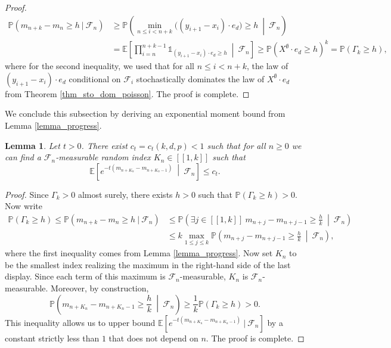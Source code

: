 \documentclass[a4paper, 11pt]{article}
\theoremstyle{plain}
\newtheorem{Lemma}[Theorem]{Lemma}
\theoremstyle{definition}
\newcommand{\E}{\mathbb{E}}
\renewcommand{\P}{\mathbb{P}}
\newcommand{\range}[2]{[\![#1,#2]\!]}
\numberwithin{equation}{section}
\begin{document}
\begin{proof}
        \begin{equation*}
            \begin{split}
                \P\left(m_{n+k}-m_n\geq h~\vert~\mathcal F_n\right)&\geq\P\left(\min_{n\leq i< n+k}\big((y_{i+1}-x_i)\cdot e_d\big)\geq h~\middle|~\mathcal F_n\right)\\
                &=\E\left[\prod_{i=n}^{n+k-1}\mathds 1_{(y_{i+1}-x_i)\cdot e_d\geq h}~\middle\vert~\mathcal F_n\right]
                \geq\P(X^\emptyset\cdot e_d\geq h)^k
                =\P(\Gamma_k\geq h),
            \end{split}
        \end{equation*}
    where for the second inequality, we used that for all $n\leq i<n+k$, the law of $(y_{i+1}-x_i)\cdot e_d$ conditional on $\mathcal F_i$ stochastically dominates the law of $X^\emptyset\cdot e_d$ from Theorem \ref{thm_sto_dom_poisson}. The proof is complete.
\end{proof}


We conclude this subsection by deriving an exponential moment bound from Lemma \ref{lemma_progress}.


\begin{Lemma}
    \label{lemma_lower_control}
    Let $t>0$. There exist $c_t=c_t(k, d, p)<1$ such that for all $n\geq 0$ we can find a $\mathcal F_n$-measurable random index $K_n\in\range{1}{k}$ such that
        \[\E\left[e^{-t(m_{n+K_n}-m_{n+K_n-1})}~\middle\vert~\mathcal F_n\right]\leq c_t.\]
\end{Lemma}

\begin{proof}
    Since $\Gamma_k>0$ almost surely, there exists $h>0$ such that $\P(\Gamma_k\geq h)>0$. Now write
    \begin{equation*}
        \begin{split}
            \P(\Gamma_k\geq h)\leq\P(m_{n+k}-m_n\geq h~\vert~\mathcal F_n)&\leq\P\left(\exists j\in\range{1}{k}~m_{n+j}-m_{n+j-1}\geq\frac{h}{k}~\middle\vert~\mathcal F_n\right)\\
            &\leq k\max_{1\leq j\leq k}\P\left(m_{n+j}-m_{n+j-1}\geq\frac{h}{k}~\middle\vert~\mathcal F_n\right),
        \end{split}
    \end{equation*}
    where the first inequality comes from Lemma \ref{lemma_progress}. Now set $K_n$ to be the smallest index realizing the maximum in the right-hand side of the last display. Since each term of this maximum is $\mathcal F_n$-measurable, $K_n$ is $\mathcal F_n$-measurable. Moreover, by construction,
        \[\P\left(m_{n+K_n}-m_{n+K_n-1}\geq\frac{h}{k}~\middle\vert~\mathcal F_n\right)\geq\frac{1}{k}\P(\Gamma_k\geq h)>0.\]
    This inequality allows us to upper bound $\E[e^{-t(m_{n+K_n}-m_{n+K_n-1})}~\vert~\mathcal F_n]$ by a constant strictly less than $1$ that does not depend on $n$. The proof is complete.
\end{proof}
\end{document}
